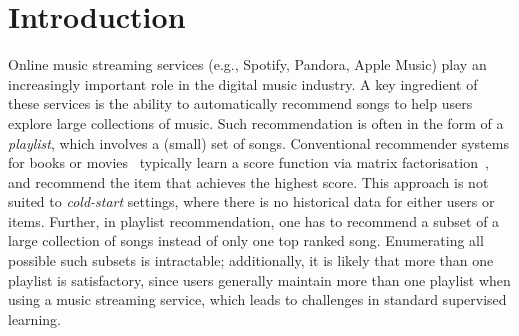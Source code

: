
\section{Introduction}
\label{sec:intro}
Online music streaming services (e.g., Spotify, Pandora, Apple Music) %
play an increasingly important role in the digital music industry.
A key ingredient of these services is the ability to automatically recommend songs to help users explore large collections of music.
Such recommendation is often in the form of a \emph{playlist}, 
which involves a (small) set of songs.
%
Conventional recommender systems for books or movies~\citep{Sarwar:2001,Netflix}
typically learn a score function via matrix factorisation~\citep{Koren:2009},
and recommend the item that achieves the highest score.
This approach is not suited to %
\emph{cold-start} settings,
where there is no historical data for either users or items.
%
Further, in playlist recommendation,
one has to recommend a subset of a large collection of songs instead of only one top ranked song.
Enumerating all possible such subsets is intractable;
additionally,
it is likely that more than one playlist is satisfactory, since
users generally maintain more than one playlist when using a music streaming service,
which leads to challenges in standard supervised learning.


